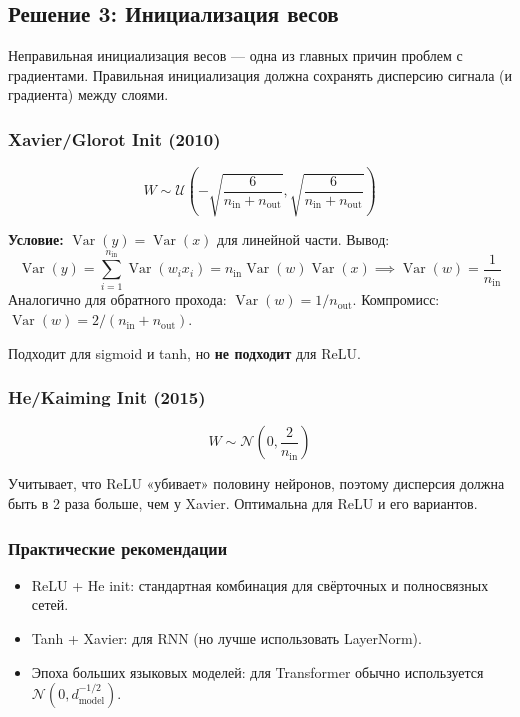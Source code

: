 \documentclass[a4paper,12pt]{article}
\begin{document}
\subsection{Решение 3: Инициализация весов}

Неправильная инициализация весов — одна из главных причин проблем с градиентами. Правильная инициализация должна сохранять дисперсию сигнала (и градиента) между слоями.

\subsubsection{Xavier/Glorot Init (2010)}
\[
W \sim \mathcal{U}\left(-\sqrt{\frac{6}{n_{\text{in}} + n_{\text{out}}}}, \sqrt{\frac{6}{n_{\text{in}} + n_{\text{out}}}}\right)
\]

\textbf{Условие:} $\operatorname{Var}(y) = \operatorname{Var}(x)$ для линейной части. Вывод:
\[
\operatorname{Var}(y) = \sum_{i=1}^{n_{\text{in}}} \operatorname{Var}(w_i x_i) = n_{\text{in}} \operatorname{Var}(w) \operatorname{Var}(x) \implies \operatorname{Var}(w) = \frac{1}{n_{\text{in}}}
\]
Аналогично для обратного прохода: $\operatorname{Var}(w) = 1 / n_{\text{out}}$. Компромисс: 
$\operatorname{Var}(w) = 2 / (n_{\text{in}} + n_{\text{out}})$.

Подходит для sigmoid и tanh, но \textbf{не подходит} для ReLU.

\subsubsection{He/Kaiming Init (2015)}
\[
W \sim \mathcal{N}\left(0, \frac{2}{n_{\text{in}}}\right)
\]

Учитывает, что ReLU «убивает» половину нейронов, поэтому дисперсия должна быть в 2 раза больше, чем у Xavier. Оптимальна для ReLU и его вариантов.

\subsubsection{Практические рекомендации}
\begin{itemize}
    \item ReLU + He init: стандартная комбинация для свёрточных и полносвязных сетей.
    \item Tanh + Xavier: для RNN (но лучше использовать LayerNorm).
    \item Эпоха больших языковых моделей: для Transformer обычно используется $\mathcal{N}(0, d_{\text{model}}^{-1/2})$.
\end{itemize}
\end{document}
